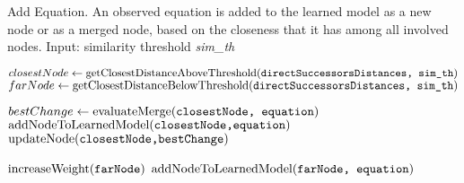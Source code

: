 \documentclass{article}
\newcommand{\vars}{\texttt}
\newcommand{\func}{\textrm}
\begin{document}
		
	\begin{algorithm}
		\caption{Add Equation. An observed equation is added to the learned model as a new node or as a merged node, based on the closeness that it has among all involved nodes.
		\newline Input: similarity threshold \textit{sim\_th}}
		\label{addEquation}
		\begin{algorithmic}[1]
			
			\State $closestNode \gets \func{getClosestDistanceAboveThreshold(\vars{directSuccessorsDistances, sim\_th})}$
			\State $farNode \gets \func{getClosestDistanceBelowThreshold(\vars{directSuccessorsDistances, sim\_th})}$
			
				\State $bestChange\gets \func{evaluateMerge(\vars{closestNode, equation})}$
					\State \Return $\func{addNodeToLearnedModel(\vars{closestNode,equation})}$
				\Else
					\State	\Return $\func{updateNode(\vars{closestNode,bestChange})}$
				\EndIf
			\EndIf
			
				\State	\Return $\func{increaseWeight(\vars{farNode})}$ 	
			\Else
				\State	\Return $\func{addNodeToLearnedModel(\vars{farNode, equation})}$
			\EndIf
			\EndIf
		
			\EndProcedure
		\end{algorithmic}
	\end{algorithm}
\end{document}

